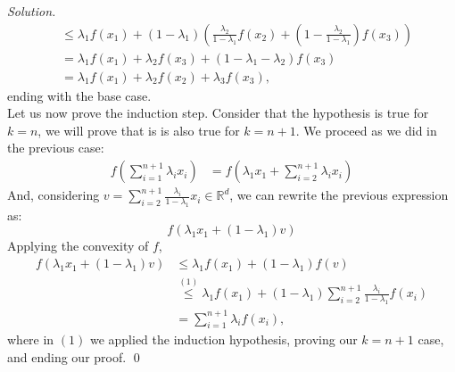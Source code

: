 \documentclass[a4paper]{article}
\newenvironment{solution}
    {\textit{Solution.}\\}
    {}
\newcommand{\R}{\mathbb R}
\begin{document}
\begin{solution}
\begin{align*}
                                                                  & \leq \lambda_1 f(x_1) + \left(1-\lambda_1\right)\left(\frac{\lambda_2}{1-\lambda_1}f(x_2) + \left(1- \frac{\lambda_2}{1-\lambda_1}\right) f(x_3) \right) \\
                                                                  & = \lambda_1 f(x_1) + \lambda_2 f(x_3) + (1-\lambda_1 - \lambda_2)f(x_3)                                                                                  \\
                                                                  & = \lambda_1 f(x_1) + \lambda_2 f(x_2) + \lambda_3 f(x_3),
  \end{align*}
  ending with the base case.\\

  Let us now prove the induction step. Consider that the hypothesis is true for \(k = n\), we will prove that is is also true for \(k = n+1\). We proceed as we did in the previous case:
  \begin{align*}
    f\left(\sum_{i=1}^{n+1} \lambda_i x_i\right) & = f\left(\lambda_1 x_1 + \sum_{i=2}^{n+1} \lambda_i x_i\right)
  \end{align*}
  And, considering \(v = \sum_{i=2}^{n+1} \frac{\lambda_i}{1-\lambda_1} x_i \in \R^d \), we can rewrite the previous expression as:
  \[
    f\left(\lambda_1 x_1 + (1-\lambda_1)v\right)
  \]
  Applying the convexity of \(f\),
  \begin{align*}
    f\left(\lambda_1 x_1 + (1-\lambda_1)v\right) & \leq \lambda_1 f(x_1) + (1-\lambda_1)f(v)                                                                \\
                                                 & \stackrel{(1)}{\leq} \lambda_1 f(x_1) + (1-\lambda_1)\sum_{i=2}^{n+1}\frac{\lambda_i}{1-\lambda_1}f(x_i) \\
                                                 & = \sum_{i=1}^{n+1} \lambda_i f(x_i),
  \end{align*}
  where in \((1)\) we applied the induction hypothesis, proving our \(k=n+1\) case, and ending our proof. \qed


\end{solution}
\end{document}
